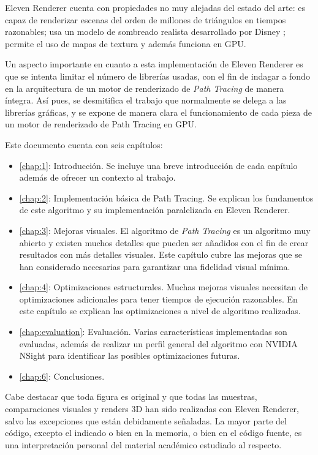 Eleven Renderer cuenta con propiedades no muy alejadas del estado del arte: es capaz de renderizar escenas del orden de millones de triángulos en tiempos razonables; usa un modelo de sombreado realista desarrollado por Disney \cite{burley2012physically}; permite el uso de mapas de textura y además funciona en GPU.

Un aspecto importante en cuanto a esta implementación de Eleven Renderer es que se intenta limitar el número de librerías usadas, con el fin de indagar a fondo en la arquitectura de un motor de renderizado de \emph{Path Tracing} de manera íntegra. Así pues, se desmitifica el trabajo que normalmente se delega a las librerías gráficas, y se expone de manera clara el funcionamiento de cada pieza de un motor de renderizado de Path Tracing en GPU.

Este documento cuenta con seis capítulos:

\begin{itemize}
	\item \autoref{chap:1}: Introducción. Se incluye una breve introducción de cada capítulo además de ofrecer un contexto al trabajo.
	\item \autoref{chap:2}: Implementación básica de Path Tracing. Se explican los fundamentos de este algoritmo y su implementación paralelizada en Eleven Renderer. 
	\item \autoref{chap:3}: Mejoras visuales. El algoritmo de \emph{Path Tracing} es un algoritmo muy abierto y existen muchos detalles que pueden ser añadidos con el fin de crear resultados con más detalles visuales. Este capítulo cubre las mejoras que se han considerado necesarias para garantizar una fidelidad visual mínima.
	\item \autoref{chap:4}: Optimizaciones estructurales. Muchas mejoras visuales necesitan de optimizaciones adicionales para tener tiempos de ejecución razonables. En este capítulo se explican las optimizaciones a nivel de algoritmo realizadas.
	\item \autoref{chap:evaluation}: Evaluación. Varias características implementadas son evaluadas, además de realizar un perfil general del algoritmo con NVIDIA NSight para identificar las posibles optimizaciones futuras.
	\item \autoref{chap:6}: Conclusiones. 
\end{itemize}

Cabe destacar que toda figura es original y que todas las muestras, comparaciones visuales y renders 3D han sido realizadas con Eleven Renderer, salvo las excepciones que están debidamente señaladas. La mayor parte del código, excepto el indicado o bien en la memoria, o bien en el código fuente, es una interpretación personal del material académico estudiado al respecto.

